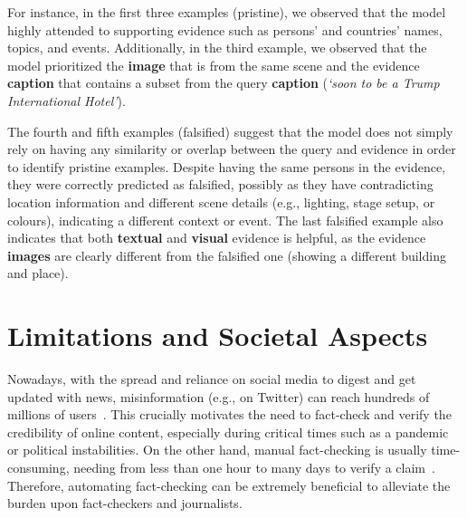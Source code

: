 For instance, in the first three examples (pristine), we observed that the model highly attended to supporting evidence such as persons' and countries' names, topics, and events. Additionally, in the third example, we observed that the model prioritized the \textbf{\textcolor{myOrange}{image}} that is from the same scene and the evidence \textbf{\textcolor{myblue}{caption}} that contains a subset from the query \textbf{\textcolor{myblue}{caption}} (\textit{`soon to be a Trump International Hotel'}). 

The fourth and fifth examples (falsified) suggest that the model does not simply rely on having any similarity or overlap between the query and evidence in order to identify pristine examples. Despite having the same persons in the evidence, they were correctly predicted as falsified, possibly as they have contradicting location information and different scene details (e.g., lighting, stage setup, or colours), indicating a different context or event. The last falsified example also indicates that both \textbf{\textcolor{myblue}{textual}} and \textbf{\textcolor{myOrange}{visual}} evidence is helpful, as the evidence \textbf{\textcolor{myOrange}{images}} are clearly different from the falsified one (showing a different building and place). 


\section{Limitations and Societal Aspects}  \label{sec:risks}
Nowadays, with the spread and reliance on social media to digest and get updated with news, misinformation (e.g., on Twitter) can reach hundreds of millions of users~\cite{vo2020facts}. This crucially motivates the need to fact-check and verify the credibility of online content, especially during critical times such as a pandemic or political instabilities. On the other hand, manual fact-checking is usually time-consuming, needing from less than one hour to many days to verify a claim~\cite{thorne2018automated}. Therefore, automating fact-checking can be extremely beneficial to alleviate the burden upon fact-checkers and journalists. 

